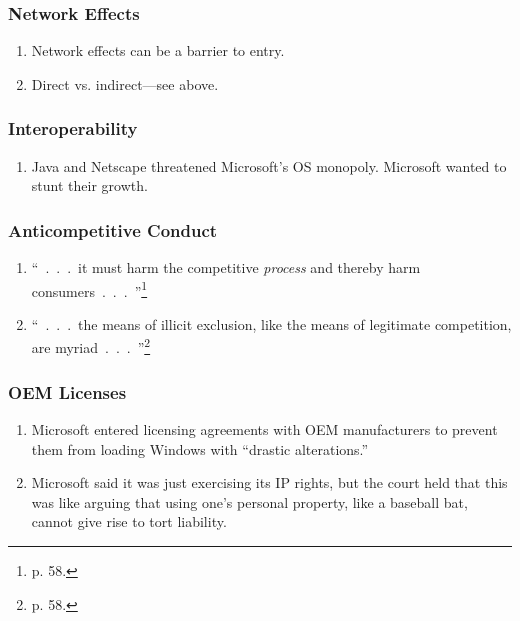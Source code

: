 \subsubsection{Network Effects}

\begin{enumerate}
    \item Network effects can be a barrier to entry.
    \item Direct vs. indirect---see above.
\end{enumerate}

\subsubsection{Interoperability}

\begin{enumerate}
    \item Java and Netscape threatened Microsoft's OS monopoly. Microsoft 
    wanted to stunt their growth.
\end{enumerate}

\subsubsection{Anticompetitive Conduct}

\begin{enumerate}
    \item ``~.~.~.~it must harm the competitive \emph{process} and thereby 
    harm consumers~.~.~.~''\footnote{p. 58.}
    \item ``~.~.~.~the means of illicit exclusion, like the means of 
    legitimate competition, are myriad~.~.~.~''\footnote{p. 58.}
\end{enumerate}

\subsubsection{OEM Licenses}

\begin{enumerate}
    \item Microsoft entered licensing agreements with OEM manufacturers to 
    prevent them from loading Windows with ``drastic alterations.''
    \item Microsoft said it was just exercising its IP rights, but the court 
    held that this was like arguing that using one's personal property, like a 
    baseball bat, cannot give rise to tort liability.
\end{enumerate}

